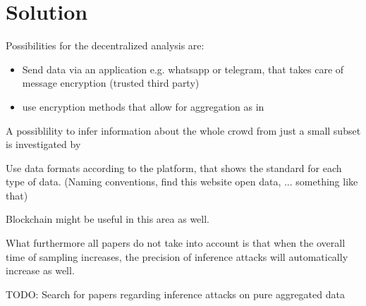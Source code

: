 \chapter{Solution}\label{chapter:solution}

Possibilities for the decentralized analysis are:
\begin{itemize}
	\item Send data via an application e.g. whatsapp or telegram, that takes care of message encryption (trusted third party)
	\item use encryption methods that allow for aggregation as in \parencite{crowdsourcing}
\end{itemize}

A possiblility to infer information about the whole crowd from just a small subset is investigated by \parencite{subset}

Use data formats according to the platform, that shows the standard for each type of data. (Naming conventions, find this website open data, ... something like that)

Blockchain might be useful in this area as well.

What furthermore all papers do not take into account is that when the overall time of sampling increases, the precision of inference attacks will automatically increase as well. 

TODO: Search for papers regarding inference attacks on pure aggregated data